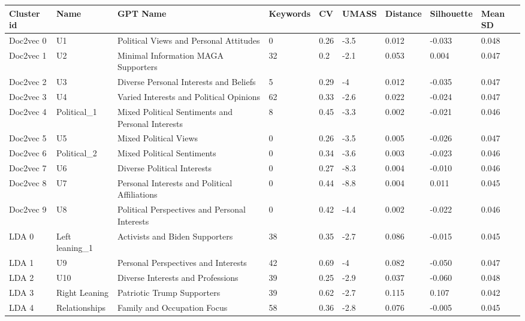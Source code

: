 \documentclass{article}
\begin{document}
\begin{table}[!ht]
\small
    \centering
    \begin{tabular}{|p{2cm}|p{2cm}|p{6cm}|p{1.2cm}|p{1cm}|p{1cm}|p{1.1cm}|p{1.3cm}|p{1cm}|}
    \hline
        Cluster id & Name & GPT Name & Keywords & CV & UMASS  & Distance & Silhouette & Mean SD \\ \hline
        Doc2vec 0 & U1 & Political Views and Personal Attitudes & 0 & 0.26 & -3.5 & 0.012 & -0.033 & 0.048 \\ \hline
        Doc2vec 1 & U2 & Minimal Information MAGA Supporters & 32 & 0.2 & -2.1 & 0.053 & 0.004 & 0.047 \\ \hline
        Doc2vec 2 & U3 & Diverse Personal Interests and Beliefs & 5 & 0.29 & -4 & 0.012 & -0.035 & 0.047 \\ \hline
        Doc2vec 3 & U4 & Varied Interests and Political Opinions & 62 & 0.33 & -2.6 & 0.022 & -0.024 & 0.047 \\ \hline
        Doc2vec 4 & Political\_1 & Mixed Political Sentiments and Personal Interests & 8 & 0.45 & -3.3 & 0.002 & -0.021 & 0.046 \\ \hline
        Doc2vec 5 & U5 & Mixed Political Views & 0 & 0.26 & -3.5 & 0.005 & -0.026 & 0.047 \\ \hline
        Doc2vec 6 & Political\_2 & Mixed Political Sentiments & 0 & 0.34 & -3.6 & 0.003 & -0.023 & 0.046 \\ \hline
        Doc2vec 7 & U6 & Diverse Political Interests & 0 & 0.27 & -8.3 & 0.004 & -0.010 & 0.046 \\ \hline
        Doc2vec 8 & U7 & Personal Interests and Political Affiliations & 0 & 0.44 & -8.8 & 0.004 & 0.011 & 0.045 \\ \hline
        Doc2vec 9 & U8 & Political Perspectives and Personal Interests & 0 & 0.42 & -4.4 & 0.002 & -0.022 & 0.046 \\ \hline
        LDA 0 & Left leaning\_1 & Activists and Biden Supporters & 38 & 0.35 & -2.7 & 0.086 & -0.015 & 0.045 \\ \hline
        LDA 1 & U9 & Personal Perspectives and Interests & 42 & 0.69 & -4 & 0.082 & -0.050 & 0.047 \\ \hline
        LDA 2 & U10 & Diverse Interests and Professions & 39 & 0.25 & -2.9 & 0.037 & -0.060 & 0.048 \\ \hline
        LDA 3 & Right Leaning & Patriotic Trump Supporters & 39 & 0.62 & -2.7 & 0.115 & 0.107 & 0.042 \\ \hline
        LDA 4 & Relationships & Family and Occupation Focus & 58 & 0.36 & -2.8 & 0.076 & -0.005 & 0.045 \\ \hline

\end{tabular}
\end{table}
\end{document}
